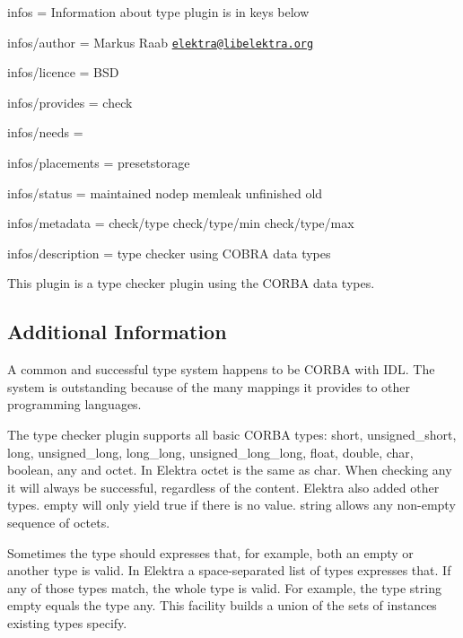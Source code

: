 
\begin{DoxyItemize}
\item infos = Information about type plugin is in keys below
\item infos/author = Markus Raab \href{mailto:elektra@libelektra.org}{\tt elektra@libelektra.\+org}
\item infos/licence = B\+S\+D
\item infos/provides = check
\item infos/needs =
\item infos/placements = presetstorage
\item infos/status = maintained nodep memleak unfinished old
\item infos/metadata = check/type check/type/min check/type/max
\item infos/description = type checker using C\+O\+B\+R\+A data types
\end{DoxyItemize}

This plugin is a type checker plugin using the {\ttfamily C\+O\+R\+B\+A} data types.

\subsection*{Additional Information}

A common and successful type system happens to be C\+O\+R\+B\+A with I\+D\+L. The system is outstanding because of the many mappings it provides to other programming languages.

The type checker plugin supports all basic C\+O\+R\+B\+A types\+: {\ttfamily short}, {\ttfamily unsigned\+\_\+short}, {\ttfamily long}, {\ttfamily unsigned\+\_\+long}, {\ttfamily long\+\_\+long}, {\ttfamily unsigned\+\_\+long\+\_\+long}, {\ttfamily float}, {\ttfamily double}, {\ttfamily char}, {\ttfamily boolean}, {\ttfamily any} and {\ttfamily octet}. In Elektra {\ttfamily octet} is the same as {\ttfamily char}. When checking any it will always be successful, regardless of the content. Elektra also added other types. {\ttfamily empty} will only yield true if there is no value. {\ttfamily string} allows any non-\/empty sequence of octets.

Sometimes the type should expresses that, for example, both an empty or another type is valid. In Elektra a space-\/separated list of types expresses that. If any of those types match, the whole type is valid. For example, the type {\ttfamily string empty} equals the type {\ttfamily any}. This facility builds a union of the sets of instances existing types specify.

